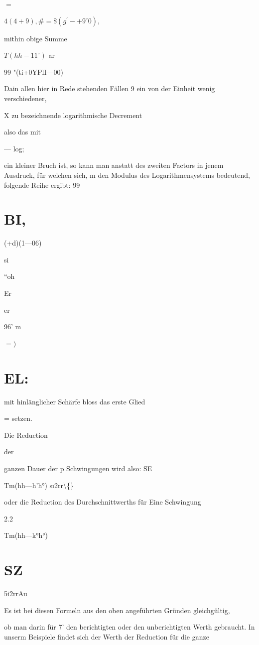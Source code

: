\documentclass[12pt,a4paper]{article}
\begin{document}
$=$

$4(4+9), \# = \$(g^{\prime}-+9^{\circ}0),$

mithin obige Summe

$T(hh- 11^{\circ})$ ar

99 "(ti+0YPlI—00)

Dain allen hier in Rede stehenden Fällen 9 ein von der Einheit wenig verschiedener,

X zu bezeichnende logarithmische Decrement

also das mit

— log;

ein kleiner Bruch ist, so kann man anstatt des zweiten Factors in jenem Ausdruck, für welchen sich, m den Modulus des Logarithmensystems bedeutend, folgende Reihe ergibt: 99

\section*{BI,}
(+d)(1—06)

si

“oh

Er

er

96’ m

$=)$

\section*{EL:}
mit hinlänglicher Schärfe bloss das erste Glied

= setzen.

Die Reduction

der

ganzen Dauer der p Schwingungen wird also: SE

Tm(hh—h’h°) sı2rr\textbackslash\{\}

oder die Reduction des Durchschnittwerths für Eine Schwingung

2.2

Tm(hh—k°h°)

\section*{SZ}
5i2rrAu

Es ist bei diesen Formeln aus den oben angeführten Gründen gleichgültig,

ob man darin für 7’ den berichtigten oder den unberichtigten Werth gebraucht. In unserm Beispiele findet sich der Werth der Reduction für die ganze
\end{document}
